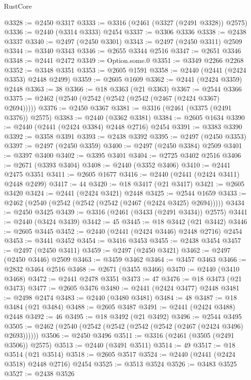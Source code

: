 \begin{lexlean}{RustCore}
\begin{coremodule}
@3328 := @2450 @3317
@3333 := @3316 (@2461 (@3327 (@2491 @3328)) @2575)
@3336 := @2440 (@3314 @3333) @2454
@3337 := @3306 @3336
@3338 := @2438 @3337
@3340 := @2497 (@2450 @3301)
@3343 := @2497 (@2450 @3311) @2509
@3344 := @3340 @3343
@3346 := @2655 @3344 @2516
@3347 := @2651 @3346
@3348 := @2441 @2472
@3349 := Option.some.{0}
@3351 := @3349 @2266 @2268
@3352 := @3348 @3351
@3353 := @2605 @1591
@3358 := @2440 (@2441 (@2424 @3353) @2448 @2499)
@3359 := @2605 @1609
@3362 := @2441 (@2424 @3359) @2448
@3363 := 38
@3366 := @18 @3363 (@21 @3363)
@3367 := @2544 @3366
@3375 := @2462 (@2540 (@2542 (@2542 (@2542 (@2467 (@2424 @3367) @2694)))))
@3376 := @2450 @3367
@3381 := @3316 (@2461 (@3375 (@2491 @3376)) @2575)
@3383 := @2440 (@3362 @3381)
@3384 := @2605 @1634
@3390 := @2440 (@2441 (@2424 @3384) @2448 @2716) @2454
@3391 := @3383 @3390
@3392 := @3358 @3391
@3393 := @2438 @3392
@3395 := @2497 (@2450 @3353)
@3397 := @2497 (@2450 @3359)
@3400 := @2497 (@2450 @3384) @2509
@3401 := @3397 @3400
@3402 := @3395 @3401
@3404 := @2725 @3402 @2516
@3406 := @2671 (@3393 @3404)
@3408 := @2440 (@3352 @3406)
@3410 := @2441 @2475 @3351
@3411 := @2605 @1677
@3416 := @2440 (@2441 (@2424 @3411) @2448 @2499)
@3417 := 44
@3420 := @18 @3417 (@21 @3417)
@3421 := @2605 @3420
@3424 := @2441 (@2424 @3421) @2448
@3425 := @2544 @1659
@3433 := @2462 (@2540 (@2542 (@2542 (@2542 (@2467 (@2424 @3425) @2694)))))
@3434 := @2450 @3425
@3439 := @3316 (@2461 (@3433 (@2491 @3434)) @2575)
@3441 := @2440 (@3424 @3439)
@3442 := 45
@3445 := @18 @3442 (@21 @3442)
@3446 := @2605 @3445
@3452 := @2440 (@2441 (@2424 @3446) @2448 @2716) @2454
@3453 := @3441 @3452
@3454 := @3416 @3453
@3455 := @2438 @3454
@3457 := @2497 (@2450 @3411)
@3459 := @2497 (@2450 @3421)
@3462 := @2497 (@2450 @3446) @2509
@3463 := @3459 @3462
@3464 := @3457 @3463
@3466 := @2832 @3464 @2516
@3468 := @2671 (@3455 @3466)
@3470 := @2440 (@3410 @3468)
@3472 := @2441 @2478 @3351
@3473 := 47
@3476 := @18 @3473 (@21 @3473)
@3477 := @2605 @3476
@3480 := @2441 (@2424 @3477) @2448
@3481 := @2498 @2474
@3483 := @2440 (@3480 @3481)
@3484 := 48
@3487 := @18 @3484 (@21 @3484)
@3488 := @2605 @3487
@3491 := @2441 (@2424 @3488) @2448
@3492 := 46
@3495 := @18 @3492 (@21 @3492)
@3496 := @2544 @3495
@3505 := @2462 (@2540 (@2542 (@2542 (@2542 (@2542 (@2467 (@2424 @3496) @2693))))))
@3506 := @2450 @3496
@3511 := @3316 (@2461 (@3505 (@2491 @3506)) @2575)
@3513 := @2440 (@3491 @3511)
@3514 := 49
@3517 := @18 @3514 (@21 @3514)
@3518 := @2605 @3517
@3524 := @2440 (@2441 (@2424 @3518) @2448 @2716) @2454
@3525 := @3513 @3524
@3526 := @3483 @3525
@3527 := @2438 @3526

\end{coremodule}
\end{lexlean}
